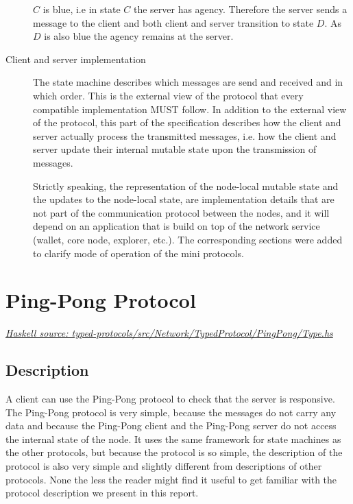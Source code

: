 \documentclass{report}
\newcommand{\hsref}[1]{\href{https://github.com/input-output-hk/ouroboros-network/blob/master/#1}{\emph{Haskell source: #1}}}
\newcommand{\msg}[1]{\texttt{#1}}
\theoremstyle{definition}{
  \newtheorem{lemma}{Lemma}[section] %
  \newtheorem{definition}[lemma]{Definition}
}
\theoremstyle{theorem}{
  \newtheorem{invariant}[lemma]{Invariant}
  \newtheorem{proofobligation}[lemma]{Proof Obligation}
}
\numberwithin{equation}{lemma}
\begin{document}
\begin{description}
      $C$ is blue, i.e in state $C$ the server has agency.
      Therefore the server sends a message to the client and
      both client and server transition to state $D$.
      As $D$ is also blue the agency remains at the server.

\item[Client and server implementation]
  The state machine describes which messages are send and received and in which order.
  This is the external view of the protocol that every compatible implementation MUST follow.
  In addition to the external view of the protocol, this part of the specification describes
  how the client and server actually process the transmitted messages,
  i.e. how the client and server update their internal mutable state
  upon the transmission of messages.

  Strictly speaking, the representation of the node-local mutable state
  and the updates to the node-local state, are implementation details that are
  not part of the communication protocol between the nodes,  and it will
  depend on an application that is build on top of the network service
  (wallet, core node, explorer, etc.).
  The corresponding sections were added to clarify mode of operation of the
  mini protocols.

\end{description}

\section{Ping-Pong Protocol}
\label{ping-pong-protocol}
\hsref{typed-protocols/src/Network/TypedProtocol/PingPong/Type.hs}
\newcommand{\Ping}{\msg{Ping}}
\newcommand{\Pong}{\msg{Pong}}

\subsection{Description}
A client can use the Ping-Pong protocol to check that the server is responsive.
The Ping-Pong protocol is very simple, because the messages do not carry any data and
because the Ping-Pong client and the Ping-Pong server do not access the internal state of the node.
It uses the same framework for state machines as the other protocols,
but because the protocol is so simple,
the description of the protocol is also very simple and slightly
different from descriptions of other protocols.
None the less the reader might
find it useful to get familiar with the protocol description we present in this report.
\end{document}
